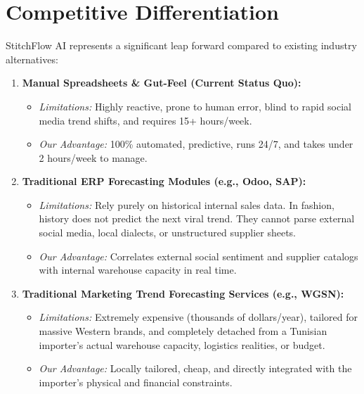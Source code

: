 \documentclass[11pt,a4paper]{article}
\begin{document}
\section{Competitive Differentiation}
StitchFlow AI represents a significant leap forward compared to existing industry alternatives:

\begin{enumerate}
    \item \textbf{Manual Spreadsheets \& Gut-Feel (Current Status Quo):}
    \begin{itemize}
        \item \textit{Limitations:} Highly reactive, prone to human error, blind to rapid social media trend shifts, and requires 15+ hours/week.
        \item \textit{Our Advantage:} 100\% automated, predictive, runs 24/7, and takes under 2 hours/week to manage.
    \end{itemize}
    \item \textbf{Traditional ERP Forecasting Modules (e.g., Odoo, SAP):}
    \begin{itemize}
        \item \textit{Limitations:} Rely purely on historical internal sales data. In fashion, history does not predict the next viral trend. They cannot parse external social media, local dialects, or unstructured supplier sheets.
        \item \textit{Our Advantage:} Correlates external social sentiment and supplier catalogs with internal warehouse capacity in real time.
    \end{itemize}
    \item \textbf{Traditional Marketing Trend Forecasting Services (e.g., WGSN):}
    \begin{itemize}
        \item \textit{Limitations:} Extremely expensive (thousands of dollars/year), tailored for massive Western brands, and completely detached from a Tunisian importer's actual warehouse capacity, logistics realities, or budget.
        \item \textit{Our Advantage:} Locally tailored, cheap, and directly integrated with the importer's physical and financial constraints.
    \end{itemize}
\end{enumerate}
\end{document}
